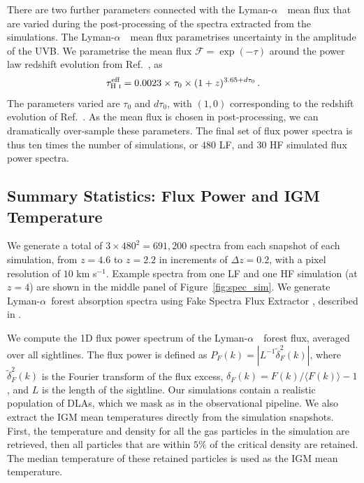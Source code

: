 \documentclass[a4paper,11pt]{article}
\newcommand{\lya}{Lyman-$\alpha$\ }
\newcommand{\Lya}{Lyman-$\alpha$\ }
\begin{document}
There are two further parameters connected with the \Lya~mean flux that are varied during the post-processing of the spectra extracted from the simulations. The \Lya~mean flux parametrises uncertainty in the amplitude of the UVB. We parametrise the mean flux $\mathcal{F} = \exp(-\tau)$ around the power law redshift evolution from Ref.~\cite{2007MNRAS.382.1657K}, as
\begin{equation}
\tau^{\text{eff}}_{\text{H~{\sc i}}} = 0.0023 \times \tau_0 \times (1+z)^{3.65 + d\tau_0}\,.
 \label{eq:meanflux}
\end{equation}
The parameters varied are $\tau_0$ and $d\tau_0$, with $(1, 0)$ corresponding to the redshift evolution of Ref.~\cite{2007MNRAS.382.1657K}.
As the mean flux is chosen in post-processing, we can dramatically over-sample these parameters. The final set of flux power spectra is thus ten times the number of simulations, or $480$ LF, and $30$ HF simulated flux power spectra.



\subsection{Summary Statistics: Flux Power and IGM Temperature}\label{sec:sim_fps}

We generate a total of $3\times 480^2 = 691,200$ spectra from each snapshot of each simulation, from $z=4.6$ to $z=2.2$ in increments of $\Delta z=0.2$, with a pixel resolution of $10$ km s$^{-1}$.
Example spectra from one LF and one HF simulation (at $z=4$) are shown in the middle panel of Figure~\ref{fig:spec_sim}.
We generate \lya forest absorption spectra using Fake Spectra Flux Extractor \cite{2017ascl.soft10012B}\footnotemark, described in \cite{2015MNRAS.447.1834B}.

We compute the 1D flux power spectrum of the \Lya~forest flux, averaged over all sightlines. The flux power is defined as $P_F(k) = |L^{-1}\tilde{\delta}^2_F(k)|$, where $\tilde{\delta}^2_F(k)$ is the Fourier transform of the flux excess, $\delta_F(k) = F(k)/\langle F(k) \rangle - 1$, and $L$ is the length of the sightline. Our simulations contain a realistic population of DLAs, which we mask as in the observational pipeline. We also extract the IGM mean temperatures directly from the simulation snapshots. First, the temperature and density for all the gas particles in the simulation are retrieved, then all particles that are within $5\%$ of the critical density are retained. The median temperature of these retained particles is used as the IGM mean temperature.
\end{document}
